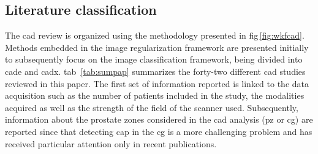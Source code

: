 \subsection{Literature classification}

The \ac{cad} review is organized using the methodology presented in \acs{fig}\,\ref{fig:wkfcad}. Methods embedded in the image regularization framework are presented initially to subsequently focus on the image classification framework, being divided into \ac{cade} and \ac{cadx}. \Acl{tab}~\ref{tab:sumpap} summarizes the forty-two different \ac{cad} studies reviewed in this paper. The first set of information reported is linked to the data acquisition such as the number of patients included in the study, the modalities acquired as well as the strength of the field of the scanner used. Subsequently, information about the prostate zones considered in the \ac{cad} analysis (\ac{pz} or \ac{cg}) are reported since that detecting \ac{cap} in the \ac{cg} is a more challenging problem and has received particular attention only in recent publications.

